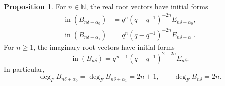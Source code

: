 \documentclass[11pt]{extarticle}
\theoremstyle{definition}
\newtheorem{proposition}[theorem]{Proposition}
\theoremstyle{remark}
\numberwithin{equation}{section}
\newcommand{\N}{\mathbb N}
\newcommand{\init}{\operatorname{in}}
\begin{document}
\begin{proposition}
\label{prop:root-leading-U}
For \(n\in\N\), the real root vectors have initial forms
\begin{align}
\init(B_{n\delta+\alpha_0})
 &=q^n(q-q^{-1})^{-2n}E_{n\delta+\alpha_0},
\label{eq:root-leading-real0}\\
\init(B_{n\delta+\alpha_1})
 &=q^n(q-q^{-1})^{-2n}E_{n\delta+\alpha_1}.
\label{eq:root-leading-real1}
\end{align}
For \(n\geq1\), the imaginary root vectors have initial forms
\begin{equation}
\label{eq:root-leading-imaginary}
        \init(B_{n\delta})
        =q^{\,n-1}(q-q^{-1})^{2-2n}E_{n\delta}.
\end{equation}
In particular,
\[
        \deg_F B_{n\delta+\alpha_0}
        =\deg_F B_{n\delta+\alpha_1}=2n+1,
        \qquad
        \deg_F B_{n\delta}=2n .
\]
\end{proposition}
\end{document}
